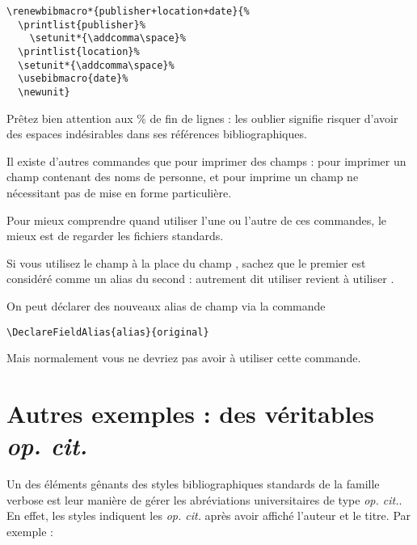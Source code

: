 \begin{verbatim}
\renewbibmacro*{publisher+location+date}{%
  \printlist{publisher}%
    \setunit*{\addcomma\space}%
  \printlist{location}%
  \setunit*{\addcomma\space}%
  \usebibmacro{date}%
  \newunit}
\end{verbatim}





Prêtez bien attention aux \% de fin de lignes : les oublier signifie risquer d'avoir des espaces indésirables dans ses références bibliographiques.


\begin{anedocte}

Il  existe d'autres commandes que  pour imprimer des champs :  pour imprimer un champ contenant des noms de personne, et  pour imprime un champ ne nécessitant pas de mise en forme particulière.

Pour mieux comprendre quand utiliser l'une ou l'autre de ces commandes, le mieux est de regarder les fichiers standards.

\end{anedocte}
\begin{anedocte}
Si vous utilisez le champ  à la place du champ , sachez que le premier est considéré comme un alias du second : autrement dit utiliser  revient à utiliser .

On peut déclarer des nouveaux alias de champ via la commande 

\begin{verbatim}
\DeclareFieldAlias{alias}{original}
\end{verbatim}

Mais normalement vous ne devriez pas avoir à utiliser cette commande.
\end{anedocte}

\section{Autres exemples : des véritables \emph{op. cit.}}

Un des éléments gênants des styles bibliographiques standards de la famille verbose est leur manière de gérer les abréviations universitaires de type \emph{op. cit.}. En effet, les styles indiquent les \emph{op. cit.} après avoir affiché l'auteur et le titre. Par exemple :

